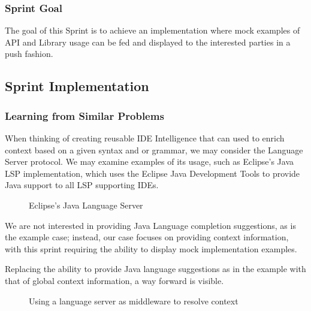\subsubsection{Sprint  Goal}

The goal of this Sprint is to achieve an implementation where mock examples of API and Library usage can be fed and displayed to the interested parties in a push fashion.

\subsection{Sprint Implementation}

\subsubsection{Learning from Similar Problems}

When thinking of creating reusable IDE Intelligence that can used to enrich context based on a given syntax and or grammar, we may consider the Language Server protocol. We may examine examples of its usage, such as Eclipse's Java LSP implementation, which uses the Eclipse Java Development Tools to provide Java support to all LSP supporting IDEs.

\begin{figure}[h!]


\caption{Eclipse's Java Language Server}

\end{figure}

We are not interested in providing Java Language completion suggestions, as is the example case; instead, our case focuses on providing context information, with this sprint requiring the ability to display mock implementation examples.

Replacing the ability to provide Java language suggestions as in the example with that of global context information, a way forward is visible.

\begin{figure}[h!]
	
\caption{Using a language server as middleware to resolve context}
\end{figure}


